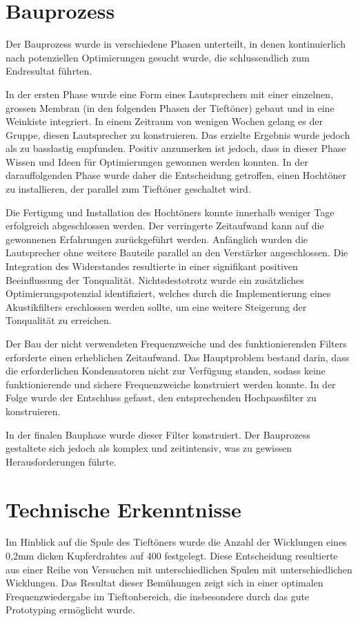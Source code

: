 \documentclass[a4paper,11pt]{report}
\begin{document}
\section{Bauprozess}
Der Bauprozess wurde in verschiedene Phasen unterteilt, in denen kontinuierlich nach potenziellen Optimierungen gesucht wurde, die schlussendlich zum Endresultat führten.

In der ersten Phase wurde eine Form eines Lautsprechers mit einer einzelnen, grossen Membran (in den folgenden Phasen der Tieftöner) gebaut und in eine Weinkiste integriert. In einem Zeitraum von wenigen Wochen gelang es der Gruppe, diesen Lautsprecher zu konstruieren. Das erzielte Ergebnis wurde jedoch als zu basslastig empfunden. Positiv anzumerken ist jedoch, dass in dieser Phase Wissen und Ideen für Optimierungen gewonnen werden konnten. In der darauffolgenden Phase wurde daher die Entscheidung getroffen, einen Hochtöner zu installieren, der parallel zum Tieftöner geschaltet wird. 

Die Fertigung und Installation des Hochtöners konnte innerhalb weniger Tage erfolgreich abgeschlossen werden. Der verringerte Zeitaufwand kann auf die gewonnenen Erfahrungen zurückgeführt werden. Anfänglich wurden die Lautsprecher ohne weitere Bauteile parallel an den Verstärker angeschlossen. Die Integration des Widerstandes resultierte in einer signifikant positiven Beeinflussung der Tonqualität. Nichtsdestotrotz wurde ein zusätzliches Optimierungspotenzial identifiziert, welches durch die Implementierung eines Akustikfilters erschlossen werden sollte, um eine weitere Steigerung der Tonqualität zu erreichen.

Der Bau der nicht verwendeten Frequenzweiche und des funktionierenden Filters erforderte einen erheblichen Zeitaufwand. Das Hauptproblem bestand darin, dass die erforderlichen Kondensatoren nicht zur Verfügung standen, sodass keine funktionierende und sichere Frequenzweiche konstruiert werden konnte. In der Folge wurde der Entschluss gefasst, den entsprechenden Hochpassfilter zu konstruieren.

In der finalen Bauphase wurde dieser Filter konstruiert. Der Bauprozess gestaltete sich jedoch als komplex und zeitintensiv, was zu gewissen Herausforderungen führte.        

\newpage
\section{Technische Erkenntnisse}
Im Hinblick auf die Spule des Tieftöners wurde die Anzahl der Wicklungen eines 0,2mm dicken Kupferdrahtes auf 400 festgelegt. Diese Entscheidung resultierte aus einer Reihe von Versuchen mit unterschiedlichen Spulen mit unterschiedlichen Wicklungen. Das Resultat dieser Bemühungen zeigt sich in einer optimalen Frequenzwiedergabe im Tieftonbereich, die insbesondere durch das gute Prototyping ermöglicht wurde.
\end{document}
